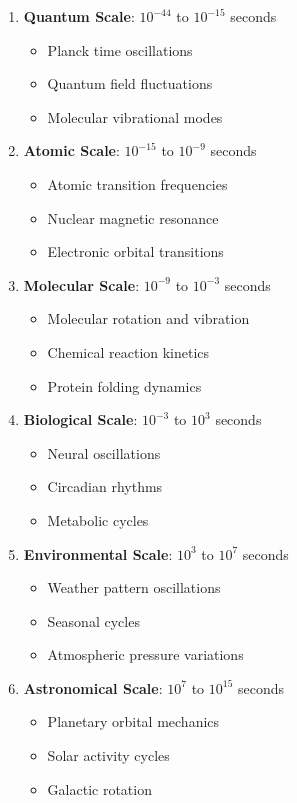 \documentclass[12pt,a4paper]{article}
\begin{document}
\begin{enumerate}
\item \textbf{Quantum Scale}: $10^{-44}$ to $10^{-15}$ seconds
   \begin{itemize}
   \item Planck time oscillations
   \item Quantum field fluctuations
   \item Molecular vibrational modes
   \end{itemize}

\item \textbf{Atomic Scale}: $10^{-15}$ to $10^{-9}$ seconds
   \begin{itemize}
   \item Atomic transition frequencies
   \item Nuclear magnetic resonance
   \item Electronic orbital transitions
   \end{itemize}

\item \textbf{Molecular Scale}: $10^{-9}$ to $10^{-3}$ seconds
   \begin{itemize}
   \item Molecular rotation and vibration
   \item Chemical reaction kinetics
   \item Protein folding dynamics
   \end{itemize}

\item \textbf{Biological Scale}: $10^{-3}$ to $10^3$ seconds
   \begin{itemize}
   \item Neural oscillations
   \item Circadian rhythms
   \item Metabolic cycles
   \end{itemize}

\item \textbf{Environmental Scale}: $10^3$ to $10^7$ seconds
   \begin{itemize}
   \item Weather pattern oscillations
   \item Seasonal cycles
   \item Atmospheric pressure variations
   \end{itemize}

\item \textbf{Astronomical Scale}: $10^7$ to $10^{15}$ seconds
   \begin{itemize}
   \item Planetary orbital mechanics
   \item Solar activity cycles
   \item Galactic rotation
   \end{itemize}
\end{enumerate}
\end{document}
